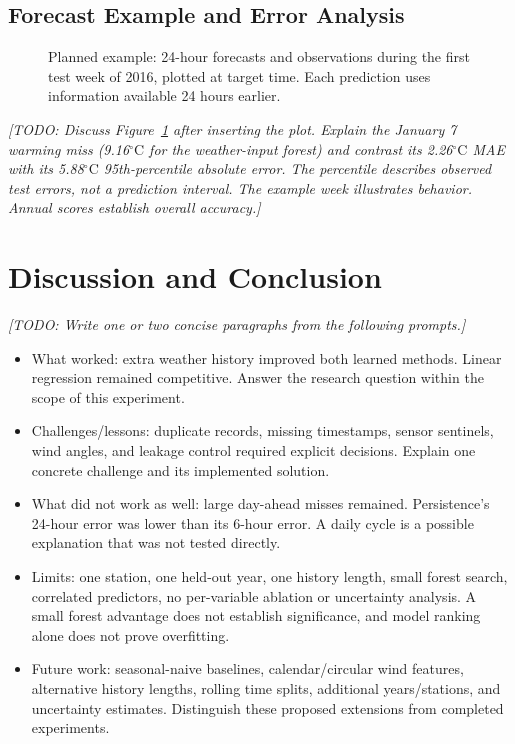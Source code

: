 \documentclass[11pt]{article}
\newcommand{\todo}[1]{\par\smallskip\noindent
  {\color{blue!60!black}\textit{[TODO: #1]}}\par\smallskip}
\newcommand{\degc}{\ensuremath{{}^{\circ}\mathrm{C}}}
\begin{document}
\subsection{Forecast Example and Error Analysis}
\begin{figure}[htbp]
\centering
{}

\caption{Planned example: 24-hour forecasts and observations during the
first test week of 2016, plotted at target time. Each prediction uses
information available 24 hours earlier.}
\label{fig:forecast}
\end{figure}
\todo{Discuss Figure~\ref{fig:forecast} after inserting the plot. Explain
the January 7 warming miss (9.16\degc{} for the weather-input forest) and
contrast its 2.26\degc{} MAE with its 5.88\degc{} 95th-percentile absolute
error. The percentile describes observed test errors, not a prediction
interval. The example week illustrates behavior. Annual scores establish
overall accuracy.}

\section{Discussion and Conclusion}
\label{sec:discussion}
\todo{Write one or two concise paragraphs from the following prompts.}
\begin{itemize}
  \item What worked: extra weather history improved both learned methods.
  Linear regression remained competitive. Answer the research question
  within the scope of this experiment.
  \item Challenges/lessons: duplicate records, missing timestamps, sensor
  sentinels, wind angles, and leakage control required explicit decisions.
  Explain one concrete challenge and its implemented solution.
  \item What did not work as well: large day-ahead misses remained.
  Persistence's 24-hour error was lower than its 6-hour error. A daily
  cycle is a possible explanation that was not tested directly.
  \item Limits: one station, one held-out year, one history length, small
  forest search, correlated predictors, no per-variable ablation or
  uncertainty analysis. A small forest advantage does not establish
  significance, and model ranking alone does not prove overfitting.
  \item Future work: seasonal-naive baselines, calendar/circular wind
  features, alternative history lengths, rolling time splits, additional
  years/stations, and uncertainty estimates. Distinguish these proposed
  extensions from completed experiments.
\end{itemize}
\end{document}
